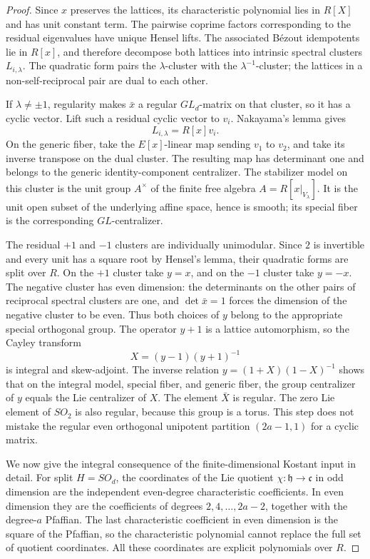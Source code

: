 \documentclass[11pt,a4paper]{article}
\theoremstyle{definition}
\theoremstyle{remark}
\begin{document}
\begin{proof}
Since \(x\) preserves the lattices, its characteristic polynomial lies
in \(R[X]\) and has unit constant term. The pairwise coprime factors
corresponding to the residual eigenvalues have unique Hensel lifts.
The associated B\'ezout idempotents lie in \(R[x]\), and therefore
decompose both lattices into intrinsic spectral clusters
\(L_{i,\lambda}\). The quadratic form pairs the \(\lambda\)-cluster
with the \(\lambda^{-1}\)-cluster; the lattices in a non-self-reciprocal
pair are dual to each other.

If \(\lambda\ne\pm1\), regularity makes \(\bar x\) a regular
\(GL_d\)-matrix on that cluster, so it has a cyclic vector. Lift such
a residual cyclic vector to \(v_i\). Nakayama's lemma gives
\[
 L_{i,\lambda}=R[x]v_i.
\]
On the generic fiber, take the \(E[x]\)-linear map sending \(v_1\) to
\(v_2\), and take its inverse transpose on the dual cluster. The
resulting map has determinant one and belongs to the generic
identity-component centralizer. The stabilizer model on this cluster
is the unit group \(A^\times\) of the finite free algebra
\(A=R[x|_{V_\lambda}]\). It is the unit open subset of the underlying
affine space, hence is smooth; its special fiber is the corresponding
\(GL\)-centralizer.

The residual \(+1\) and \(-1\) clusters are individually unimodular.
Since \(2\) is invertible and every unit has a square root by Hensel's
lemma, their quadratic forms are split over \(R\). On the \(+1\)
cluster take \(y=x\), and on the \(-1\) cluster take \(y=-x\). The
negative cluster has even dimension: the determinants on the other
pairs of reciprocal spectral clusters are one, and
\(\det\bar x=1\) forces the dimension of the negative cluster to be
even. Thus both choices of \(y\) belong to the appropriate special
orthogonal group. The operator \(y+1\) is a lattice automorphism, so
the Cayley transform
\[
 X=(y-1)(y+1)^{-1}
\]
is integral and skew-adjoint. The inverse relation
\(y=(1+X)(1-X)^{-1}\) shows that on the integral model, special fiber,
and generic fiber, the group centralizer of \(y\) equals the Lie
centralizer of \(X\). The element \(\bar X\) is regular. The zero Lie
element of \(SO_2\) is also regular, because this group is a torus.
This step does not mistake the regular even orthogonal unipotent
partition \((2a-1,1)\) for a cyclic matrix.

We now give the integral consequence of the finite-dimensional
Kostant input in detail. For split \(H=SO_d\), the coordinates of the
Lie quotient \(\chi:\mathfrak h\to\mathfrak c\) in odd dimension are
the independent even-degree characteristic coefficients. In even
dimension they are the coefficients of degrees
\(2,4,\ldots,2a-2\), together with the degree-\(a\) Pfaffian.
The last characteristic coefficient in even dimension is the square
of the Pfaffian, so the characteristic polynomial cannot replace
the full set of quotient coordinates. All these coordinates are
explicit polynomials over \(R\).


\end{proof}
\end{document}
